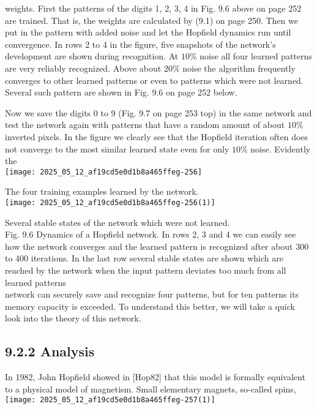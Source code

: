 \documentclass[10pt]{article}
\begin{document}
weights. First the patterns of the digits 1, 2, 3, 4 in Fig. 9.6 above on page 252 are trained. That is, the weights are calculated by (9.1) on page 250. Then we put in the pattern with added noise and let the Hopfield dynamics run until convergence. In rows 2 to 4 in the figure, five snapshots of the network's development are shown during recognition. At $10 \%$ noise all four learned patterns are very reliably recognized. Above about $20 \%$ noise the algorithm frequently converges to other learned patterns or even to patterns which were not learned. Several such pattern are shown in Fig. 9.6 on page 252 below.

Now we save the digits 0 to 9 (Fig. 9.7 on page 253 top) in the same network and test the network again with patterns that have a random amount of about $10 \%$ inverted pixels. In the figure we clearly see that the Hopfield iteration often does not converge to the most similar learned state even for only $10 \%$ noise. Evidently the\\
\texttt{[image: 2025\_05\_12\_af19cd5e0d1b8a465ffeg-256]}

The four training examples learned by the network.\\
\texttt{[image: 2025\_05\_12\_af19cd5e0d1b8a465ffeg-256(1)]}

Several stable states of the network which were not learned.\\
Fig. 9.6 Dynamics of a Hopfield network. In rows 2, 3 and 4 we can easily see how the network converges and the learned pattern is recognized after about 300 to 400 iterations. In the last row several stable states are shown which are reached by the network when the input pattern deviates too much from all learned patterns\\
network can securely save and recognize four patterns, but for ten patterns its memory capacity is exceeded. To understand this better, we will take a quick look into the theory of this network.

\subsection*{9.2.2 Analysis}
In 1982, John Hopfield showed in [Hop82] that this model is formally equivalent to a physical model of magnetism. Small elementary magnets, so-called spins,\\
\texttt{[image: 2025\_05\_12\_af19cd5e0d1b8a465ffeg-257(1)]}
\end{document}

